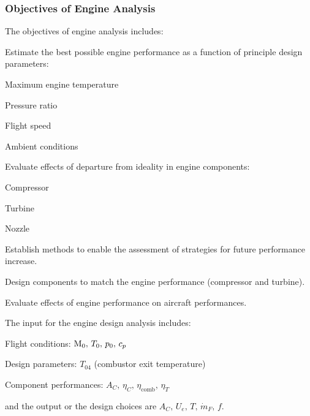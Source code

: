 \subsubsection{Objectives of Engine Analysis}
The objectives of engine analysis includes:
\begin{itemizePacked}
\item Estimate the best possible engine performance as a function of principle design parameters:
  \begin{itemizePacked}
  \item Maximum engine temperature
  \item Pressure ratio
  \item Flight speed
  \item Ambient conditions
  \end{itemizePacked}
\item Evaluate effects of departure from ideality in engine components:
  \begin{itemizePacked}
  \item Compressor
  \item Turbine
  \item Nozzle
  \end{itemizePacked}
\item Establish methods to enable the assessment of strategies for future performance increase.
\item Design components to match the engine performance (compressor and turbine).
\item Evaluate effects of engine performance on aircraft performances.
\end{itemizePacked}
The input for the engine design analysis includes:
\begin{itemizePacked}
\item Flight conditions: ${\rm{M}}_0,\, T_0, \,p_0,\, c_p$
\item Design parameters: $T_{04}$ (combustor exit temperature)
\item Component performances: $A_C,\, \eta_C,\, \eta_\text{comb},\, \eta_T$
\end{itemizePacked}
and the output or the design choices are $A_C,\, U_e,\, T,\, \dot{m}_F,\, f$.


